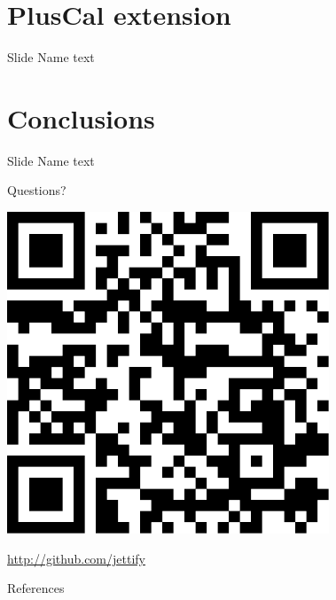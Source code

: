 \documentclass[12pt]{beamer}
\begin{document}
  \section{PlusCal extension}
  \begin{frame}{Slide Name}
      text
  \end{frame}
  \section{Conclusions}
  \begin{frame}{Slide Name}
      text
  \end{frame}
\begin{frame}
    \vspace{1cm}
    \begin{center}{\Huge Questions?} \end{center}
    \begin{center} \includegraphics[scale=0.7]{figures/qrcode}\end{center}
    \begin{center}
        \href{http://github.com/jettify}{http://github.com/jettify}
    \end{center}
\end{frame}
\appendix
\begin{frame}[shrink=30]{References}
    
    
\end{frame}
\end{document}
